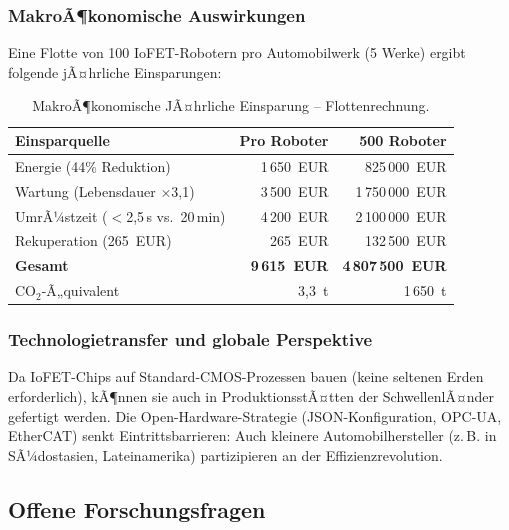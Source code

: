 ﻿\documentclass[a4paper,12pt]{scrreprt}
\theoremstyle{definition}
\begin{document}
\subsubsection{MakroÃ¶konomische Auswirkungen}

Eine Flotte von 100 IoFET-Robotern pro Automobilwerk (5 Werke)
ergibt folgende jÃ¤hrliche Einsparungen:

\begin{table}[H]
\centering
\caption{MakroÃ¶konomische JÃ¤hrliche Einsparung -- Flottenrechnung.}
\label{tab:makroe}
\small
\begin{tabular}{|l|r|r|}
\hline
\rowcolor{fpgagreen!20}
\textbf{Einsparquelle} & \textbf{Pro Roboter} & \textbf{500 Roboter} \\
\hline
Energie (44\% Reduktion) & 1\,650~EUR & 825\,000~EUR \\
\hline
Wartung (Lebensdauer $\times$3,1) & 3\,500~EUR & 1\,750\,000~EUR \\
\hline
UmrÃ¼stzeit ($<$2,5\,s vs.\ 20\,min) & 4\,200~EUR & 2\,100\,000~EUR \\
\hline
Rekuperation (265~EUR) & 265~EUR & 132\,500~EUR \\
\hline
\textbf{Gesamt} & \textbf{9\,615~EUR} & \textbf{4\,807\,500~EUR} \\
\hline
CO$_2$-Ã„quivalent & 3,3~t & 1\,650~t \\
\hline
\end{tabular}
\end{table}

\subsubsection{Technologietransfer und globale Perspektive}

Da IoFET-Chips auf Standard-CMOS-Prozessen bauen (keine seltenen
Erden erforderlich), kÃ¶nnen sie auch in ProduktionsstÃ¤tten
der SchwellenlÃ¤nder gefertigt werden. Die Open-Hardware-Strategie
(JSON-Konfiguration, OPC-UA, EtherCAT) senkt Eintrittsbarrieren:
Auch kleinere Automobilhersteller (z.\,B. in SÃ¼dostasien, Lateinamerika)
partizipieren an der Effizienzrevolution.

\subsection{Offene Forschungsfragen}
\end{document}
